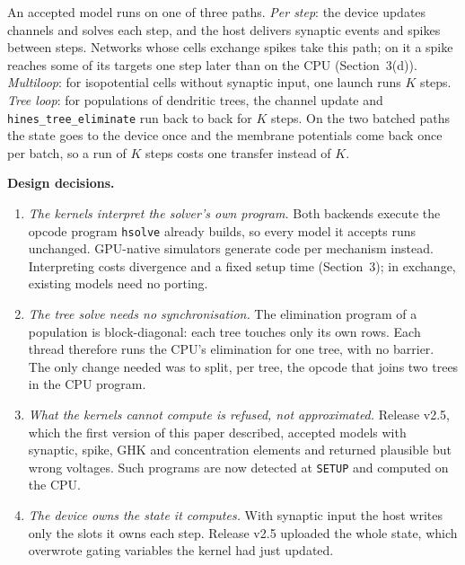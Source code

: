 \documentclass[preprint,12pt,a4paper]{elsarticle}
\newcommand{\hte}{\texttt{hines\_\allowbreak tree\_\allowbreak eliminate}}
\begin{document}
\begin{enumerate}
\begin{enumerate}
An accepted model runs on one of three paths. \emph{Per step}: the device updates
channels and solves each step, and the host delivers synaptic events and spikes between
steps. Networks whose cells exchange spikes take this path; on it a spike reaches some
of its targets one step later than on the CPU (Section~3(d)).
\emph{Multiloop}:
for isopotential cells without synaptic input, one launch runs $K$ steps.
\emph{Tree loop}: for populations of dendritic trees, the channel update and \hte{}
run back to back for $K$ steps. On the two batched paths the state goes to the device
once and the membrane potentials come back once per batch, so a run of $K$ steps
costs one transfer instead of $K$.

\textbf{Design decisions.} %
\begin{enumerate}
\item \emph{The kernels interpret the solver's own program.} Both backends execute the
      opcode program \texttt{hsolve} already builds, so every model it accepts runs
      unchanged. GPU-native simulators generate code per mechanism instead. Interpreting
      costs divergence and a fixed setup time (Section~3); in exchange, existing
      models need no porting.
\item \emph{The tree solve needs no synchronisation.} The elimination program of a
      population is block-diagonal: each tree touches only its own rows. Each thread
      therefore runs the CPU's elimination for one tree, with no barrier. The only
      change needed was to split, per tree, the opcode that joins two trees in the CPU
      program.
\item \emph{What the kernels cannot compute is refused, not approximated.} Release v2.5,
      which the first version of this paper described, accepted models with synaptic,
      spike, GHK and concentration elements and returned plausible but wrong voltages. Such programs are now detected at
      \texttt{SETUP} and computed on the CPU.
\item \emph{The device owns the state it computes.} With synaptic input the host
      writes only the slots it owns each step. Release v2.5 uploaded the whole state,
      which overwrote gating variables the kernel had just updated.
\end{enumerate}


\end{enumerate}
\end{enumerate}
\end{document}
